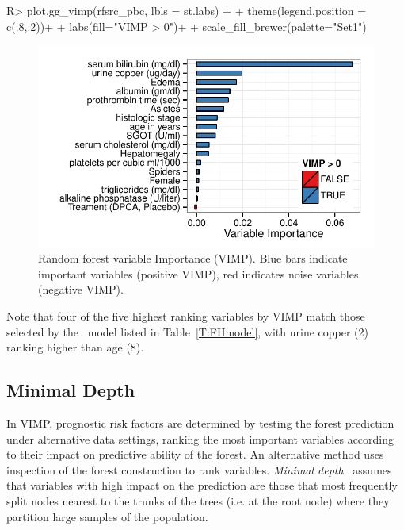 \documentclass[nojss]{jss}\usepackage[]{graphicx}\usepackage[]{color}
\makeatletter
\def\maxwidth{ %
  \ifdim\Gin@nat@width>\linewidth
    \linewidth
  \else
    \Gin@nat@width
  \fi
}
\makeatother
\begin{document}
\begin{Schunk}
\begin{Sinput}
R> plot.gg_vimp(rfsrc_pbc, lbls = st.labs) + 
+   theme(legend.position = c(.8,.2))+
+   labs(fill="VIMP > 0")+
+   scale_fill_brewer(palette="Set1")
\end{Sinput}
\begin{figure}[!htpb]

{\centering \includegraphics[width=\maxwidth]{figure/rfs-rf-vimp-1} 

}

\caption[Random forest variable Importance (VIMP)]{Random forest variable Importance (VIMP). Blue bars indicate important variables (positive VIMP), red indicates noise variables (negative VIMP).\label{fig:rf-vimp}}
\end{figure}
\end{Schunk}

Note that four of the five highest ranking variables by VIMP match those selected by the~\cite{fleming:1991} model listed in Table~\ref{T:FHmodel}, with urine copper (2) ranking higher than age (8).  

\subsection{Minimal Depth}\label{S:minimalDepth}

In VIMP, prognostic risk factors are determined by testing the forest prediction under alternative data settings, ranking the most important variables according to their impact on predictive ability of the forest. An alternative method uses inspection of the forest construction to rank variables. \emph{Minimal depth}~\citep{Ishwaran:2010, Ishwaran:2011} assumes that variables with high impact on the prediction are those that most frequently split nodes nearest to the trunks of the trees (i.e. at the root node) where they partition large samples of the population. 
\end{document}
